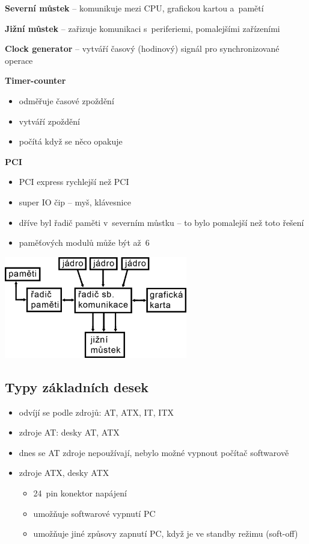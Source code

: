 \documentclass[a4paper,12pt]{article}
\providecommand{\tightlist}{%
\setlength{\itemsep}{0pt}\setlength{\parskip}{0pt}}
\begin{document}
\textbf{Severní můstek} -- komunikuje mezi CPU, grafickou kartou a~pamětí

\textbf{Jižní můstek} -- zařizuje komunikaci s~periferiemi, pomalejšími
zařízeními

\textbf{Clock generator} -- vytváří časový (hodinový) signál pro synchronizované
operace

\textbf{Timer-counter}
\begin{itemize}
  \tightlist
  \item odměřuje časové zpoždění
  \item vytváří zpoždění
  \item počítá když se něco opakuje
\end{itemize}

\begin{minipage}[b]{0.45\textwidth}
  \textbf{PCI}
  \begin{itemize}
    \tightlist
    \item PCI express rychlejší než PCI
    \item super IO čip -- myš, klávesnice
    \item dříve byl řadič paměti v~severním můstku -- to bylo pomalejší než toto řešení
    \item paměťových modulů může být až~6
  \end{itemize}
\end{minipage}%
\begin{minipage}[b]{0.5\textwidth}
  \includegraphics[width=8cm]{ref/blokove-schema-procesoru-s-jednim-cipem.png}
\end{minipage}

\subsection{Typy základních desek}

\begin{itemize}
  \tightlist
  \item odvíjí se podle zdrojů: AT, ATX, IT, ITX
  \item zdroje AT: desky AT, ATX
  \item dnes se AT zdroje nepoužívají, nebylo možné vypnout počítač softwarově
  \item zdroje ATX, desky ATX
  \begin{itemize}
    \tightlist
    \item 24~pin konektor napájení
    \item umožňuje softwarové vypnutí PC
    \item umožňuje jiné způsovy zapnutí PC, když je ve standby režimu (soft-off)
  \end{itemize}
\end{itemize}
\end{document}
